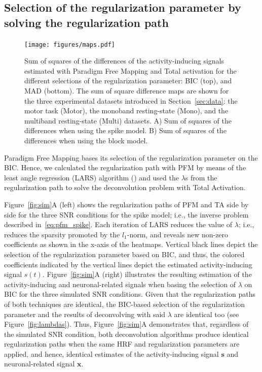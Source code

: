 \subsection{Selection of the regularization parameter by solving the regularization path}
\label{sec:regpath}

\begin{figure}[t!]
    \begin{center}
        \texttt{[image: figures/maps.pdf]}
    \end{center}
    \caption{Sum of squares of the differences of the activity-inducing signals estimated with Paradigm Free Mapping and Total activation for the different selections of the regularization parameter: BIC (top), and MAD (bottom). The sum of square difference maps are shown for the three experimental datasets introduced in Section~\ref{sec:data}: the motor task (Motor), the monoband resting-state (Mono), and the multiband resting-state (Multi) datasets. A) Sum of squares of the differences when using the spike model. B) Sum of squares of the differences when using the block model.}
\label{fig:rss}
\end{figure}

Paradigm Free Mapping bases its selection of the regularization parameter on the BIC. Hence, we calculated the regularization path with PFM by means of the least angle regression (LARS) algorithm (\citealt{efron2004LeastAngleRegression}) and used the \(\lambda\)s from the regularization path to solve the deconvolution problem with Total Activation.

Figure~\ref{fig:sim}A (left) shows the regularization paths of PFM and TA side by side for the three SNR conditions for the spike model; i.e., the inverse problem described in~\eqref{eq:pfm_spike}. Each iteration of LARS reduces the value of \(\lambda\); i.e., reduces the sparsity promoted by the \(l_1\)-norm, and reveals new non-zero coefficients as shown in the x-axis of the heatmaps. Vertical black lines depict the selection of the regularization parameter based on BIC, and thus, the colored coefficients indicated by the vertical lines depict the estimated activity-inducing signal \(s(t)\). Figure~\ref{fig:sim}A (right) illustrates the resulting estimation of the activity-inducing and neuronal-related signals when basing the selection of \(\lambda\) on BIC for the three simulated SNR conditions. Given that the regularization paths of both techniques are identical, the BIC-based selection of the regularization parameter and the results of deconvolving with said \(\lambda\) are identical too (see Figure~\ref{fig:lambdas}). Thus, Figure~\ref{fig:sim}A demonstrates that, regardless of the simulated SNR condition, both deconvolution algorithms produce identical regularization paths when the same HRF and regularization parameters are applied, and hence, identical estimates of the activity-inducing signal \(\mathbf{s}\) and neuronal-related signal \(\mathbf{x}\).

